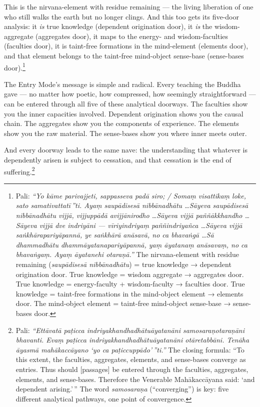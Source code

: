 This is the nirvana-element with residue remaining --- the living liberation of one who still walks the earth but no longer clings. And this too gets its five-door analysis: it \textit{is} true knowledge (dependent origination door), it \textit{is} the wisdom-aggregate (aggregates door), it maps to the energy- and wisdom-faculties (faculties door), it is taint-free formations in the mind-element (elements door), and that element belongs to the taint-free mind-object sense-base (sense-bases door).\footnote{Pali: \textit{``Yo kāme parivajjeti, sappasseva padā siro; / Somaṃ visattikaṃ loke, sato samativattatī\,''ti. Ayaṃ saupādisesā nibbānadhātu \ldots Sāyeva saupādisesā nibbānadhātu vijjā, vijjuppādā avijjānirodho \ldots Sāyeva vijjā paññākkhandho \ldots Sāyeva vijjā dve indriyāni --- vīriyindriyaṃ paññindriyañca \ldots Sāyeva vijjā saṅkhārapariyāpannā, ye saṅkhārā anāsavā, no ca bhavaṅgā \ldots Sā dhammadhātu dhammāyatanapariyāpannā, yaṃ āyatanaṃ anāsavaṃ, no ca bhavaṅgaṃ. Ayaṃ āyatanehi otaraṇā.''} The nirvana-element with residue remaining (\textit{saupādisesā nibbānadhātu}) = true knowledge → dependent origination door. True knowledge = wisdom aggregate → aggregates door. True knowledge = energy-faculty + wisdom-faculty → faculties door. True knowledge = taint-free formations in the mind-object element → elements door. The mind-object element = taint-free mind-object sense-base → sense-bases door.}

\ornament

The Entry Mode's message is simple and radical. Every teaching the Buddha gave --- no matter how poetic, how compressed, how seemingly straightforward --- can be entered through all five of these analytical doorways. The faculties show you the inner capacities involved. Dependent origination shows you the causal chain. The aggregates show you the components of experience. The elements show you the raw material. The sense-bases show you where inner meets outer.

And every doorway leads to the same nave: the understanding that whatever is dependently arisen is subject to cessation, and that cessation is the end of suffering.\footnote{Pali: \textit{``Ettāvatā paṭicca indriyakhandhadhātuāyatanāni samosaraṇotaraṇāni bhavanti. Evaṃ paṭicca indriyakhandhadhātuāyatanāni otāretabbāni. Tenāha āyasmā mahākaccāyano `yo ca paṭiccuppādo'\,''ti.''} The closing formula: ``To this extent, the faculties, aggregates, elements, and sense-bases converge as entries. Thus should [passages] be entered through the faculties, aggregates, elements, and sense-bases. Therefore the Venerable Mahākaccāyana said: `and dependent arising.'\,'' The word \textit{samosaraṇa} (``converging'') is key: five different analytical pathways, one point of convergence.}
